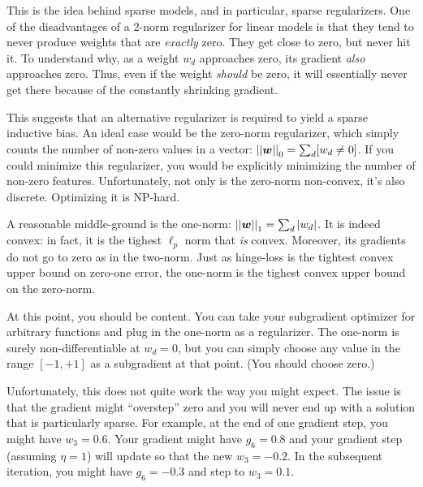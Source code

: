 This is the idea behind sparse models, and in particular, sparse
regularizers.  One of the disadvantages of a 2-norm regularizer for
linear models is that they tend to never produce weights that are
\emph{exactly} zero.  They get close to zero, but never hit it.  To
understand why, as a weight $w_d$ approaches zero, its gradient
\emph{also} approaches zero.  Thus, even if the weight \emph{should}
be zero, it will essentially never get there because of the constantly
shrinking gradient.

This suggests that an alternative regularizer is required to yield a
sparse inductive bias.  An ideal case would be the zero-norm
regularizer, which simply counts the number of non-zero values in a
vector: $\left\vert\left\vert {\boldsymbol{w}} \right\vert\right\vert_0 = \sum_d [w_d \neq 0]$.  If you could minimize
this regularizer, you would be explicitly minimizing the number of
non-zero features.  Unfortunately, not only is the zero-norm
non-convex, it's also discrete.  Optimizing it is NP-hard.

A reasonable middle-ground is the one-norm: $\left\vert\left\vert {\boldsymbol{w}} \right\vert\right\vert_1 = \sum_d
\left\vert w_d \right\vert$.  It is indeed convex: in fact, it is the tighest $\ell_p$
norm that \emph{is} convex.  Moreover, its gradients do not go to zero
as in the two-norm.  Just as hinge-loss is the tightest convex
upper bound on zero-one error, the one-norm is the tighest convex
upper bound on the zero-norm.

At this point, you should be content.  You can take your subgradient
optimizer for arbitrary functions and plug in the one-norm as a
regularizer.  The one-norm is surely non-differentiable at $w_d = 0$,
but you can simply choose any value in the range $[-1,+1]$ as a
subgradient at that point.  (You should choose zero.)

Unfortunately, this does not quite work the way you might expect.  The
issue is that the gradient might ``overstep'' zero and you will never
end up with a solution that is particularly sparse.  For example, at
the end of one gradient step, you might have $w_3 = 0.6$.  Your
gradient might have $g_6 = 0.8$ and your gradient step (assuming
$\eta=1$) will update so that the new $w_3 = -0.2$.  In the subsequent
iteration, you might have $g_6 = -0.3$ and step to $w_3 = 0.1$.

